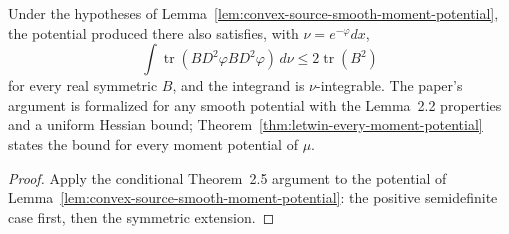 \begin{theorem}
  \label{thm:convex-source-sharp-trace}
  \leanok
  Under the hypotheses of Lemma~\ref{lem:convex-source-smooth-moment-potential}, the potential
  produced there also satisfies, with $\nu=e^{-\varphi}dx$,
  \[
    \int\operatorname{tr}(B D^2\varphi B D^2\varphi)\,d\nu\le2\operatorname{tr}(B^2)
  \]
  for every real symmetric $B$, and the integrand is $\nu$-integrable. The paper's argument is
  formalized for any smooth potential with the Lemma~2.2 properties and a uniform Hessian bound;
  Theorem~\ref{thm:letwin-every-moment-potential} states the bound for every moment potential of $\mu$.
\end{theorem}
\begin{proof}
  \leanok
  Apply the conditional Theorem~2.5 argument to the potential of
  Lemma~\ref{lem:convex-source-smooth-moment-potential}: the positive semidefinite case first, then the
  symmetric extension.
\end{proof}


